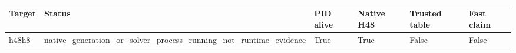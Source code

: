 {\small
\begin{tabular}{llllll}
\hline
Target & Status & PID alive & Native H48 & Trusted table & Fast claim \\
\hline
h48h8 & native\_generation\_or\_solver\_process\_running\_not\_runtime\_evidence & True & True & False & False \\
\hline
\end{tabular}
}
